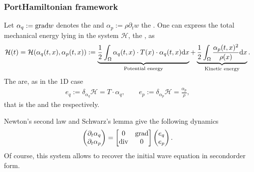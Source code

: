 \documentclass[letterpaper,10pt,english]{sphinxmanual}
\begin{document}
\subsubsection{Port\sphinxhyphen{}Hamiltonian framework}
\label{\detokenize{examples/wave:port-hamiltonian-framework}}
\sphinxAtStartPar
Let \(\alpha_q := {\rm grad} w\) denotes the  and
\(\alpha_p := \rho \partial_t w\) the . One can
express the total mechanical energy lying in the system
\(\mathcal{H}\), the , as
\begin{equation*}
\begin{split}\mathcal{H}(t) = \mathcal{H}(\alpha_q(t,x), \alpha_p(t,x)) := \underbrace{\frac{1}{2} \int_\Omega \alpha_q(t,x) \cdot T(x) \cdot \alpha_q(t,x) {\rm d}x}_{\text{Potential energy}} + \underbrace{\frac{1}{2} \int_\Omega \frac{\alpha_p(t,x)^2}{\rho(x)} {\rm d}x}_{\text{Kinetic energy}}.\end{split}
\end{equation*}
\sphinxAtStartPar
The  are, as in the 1D case
\begin{equation*}
\begin{split}e_q := \delta_{\alpha_q} \mathcal{H} = T \cdot \alpha_q, \qquad e_p := \delta_{\alpha_p} \mathcal{H} = \frac{\alpha_p}{\rho},\end{split}
\end{equation*}
\sphinxAtStartPar
that is the  and the  respectively.

\sphinxAtStartPar
Newton’s second law and Schwarz’s lemma give the following dynamics
\begin{equation*}
\begin{split}\begin{pmatrix} \partial_t \alpha_q \\ \partial_t \alpha_p \end{pmatrix}
=
\begin{bmatrix} 0 & {\rm grad} \\ {\rm div} & 0 \end{bmatrix}
\begin{pmatrix} e_q \\ e_p \end{pmatrix}.\end{split}
\end{equation*}
\sphinxAtStartPar
Of course, this system allows to recover the initial wave equation in
second\sphinxhyphen{}order form.
\end{document}
